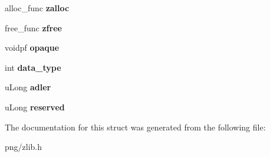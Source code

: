 \begin{DoxyCompactItemize}
\item 
alloc\+\_\+func {\bfseries zalloc}\hypertarget{structz__stream__s_a23a2299c384f808e76e9908f21216b0f}{}\label{structz__stream__s_a23a2299c384f808e76e9908f21216b0f}

\item 
free\+\_\+func {\bfseries zfree}\hypertarget{structz__stream__s_a89eb750ade7f4f0b56bfdadf13344982}{}\label{structz__stream__s_a89eb750ade7f4f0b56bfdadf13344982}

\item 
voidpf {\bfseries opaque}\hypertarget{structz__stream__s_ab72467f908d2ce65d5b42ee6556ef8bb}{}\label{structz__stream__s_ab72467f908d2ce65d5b42ee6556ef8bb}

\item 
int {\bfseries data\+\_\+type}\hypertarget{structz__stream__s_a9d8f63877d7639a8bca60f9fc3704fc4}{}\label{structz__stream__s_a9d8f63877d7639a8bca60f9fc3704fc4}

\item 
u\+Long {\bfseries adler}\hypertarget{structz__stream__s_ade2217fe31e671be1257731883201223}{}\label{structz__stream__s_ade2217fe31e671be1257731883201223}

\item 
u\+Long {\bfseries reserved}\hypertarget{structz__stream__s_add73791dd19b49c9c68f3f3d328c37db}{}\label{structz__stream__s_add73791dd19b49c9c68f3f3d328c37db}

\end{DoxyCompactItemize}


The documentation for this struct was generated from the following file\+:\begin{DoxyCompactItemize}
\item 
png/zlib.\+h\end{DoxyCompactItemize}
